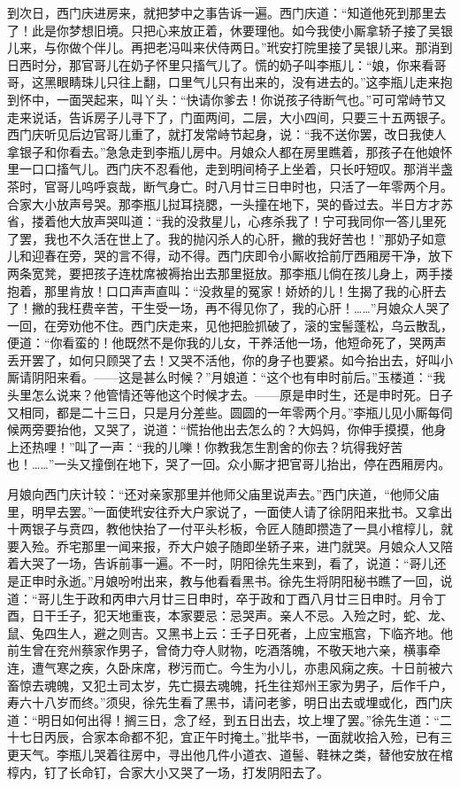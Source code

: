 到次日，西门庆进房来，就把梦中之事告诉一遍。西门庆道：“知道他死到那里去了！此是你梦想旧境。只把心来放正着，休要理他。如今我使小厮拿轿子接了吴银儿来，与你做个伴儿。再把老冯叫来伏侍两日。”玳安打院里接了吴银儿来。那消到日西时分，那官哥儿在奶子怀里只搐气儿了。慌的奶子叫李瓶儿：“娘，你来看哥哥，这黑眼睛珠儿只往上翻，口里气儿只有出来的，没有进去的。”这李瓶儿走来抱到怀中，一面哭起来，叫丫头：“快请你爹去！你说孩子待断气也。”可可常峙节又走来说话，告诉房子儿寻下了，门面两间，二层，大小四间，只要三十五两银子。西门庆听见后边官哥儿重了，就打发常峙节起身，说：“我不送你罢，改日我使人拿银子和你看去。”急急走到李瓶儿房中。月娘众人都在房里瞧着，那孩子在他娘怀里一口口搐气儿。西门庆不忍看他，走到明间椅子上坐着，只长吁短叹。那消半盏茶时，官哥儿呜呼哀哉，断气身亡。时八月廿三日申时也，只活了一年零两个月。合家大小放声号哭。那李瓶儿挝耳挠腮，一头撞在地下，哭的昏过去。半日方才苏省，搂着他大放声哭叫道：“我的没救星儿，心疼杀我了！宁可我同你一答儿里死了罢，我也不久活在世上了。我的抛闪杀人的心肝，撇的我好苦也！”那奶子如意儿和迎春在旁，哭的言不得，动不得。西门庆即令小厮收拾前厅西厢房干净，放下两条宽凳，要把孩子连枕席被褥抬出去那里挺放。那李瓶儿倘在孩儿身上，两手搂抱着，那里肯放！口口声声直叫：“没救星的冤家！娇娇的儿！生揭了我的心肝去了！撇的我枉费辛苦，干生受一场，再不得见你了，我的心肝！……”月娘众人哭了一回，在旁劝他不住。西门庆走来，见他把脸抓破了，滚的宝髻蓬松，乌云散乱，便道：“你看蛮的！他既然不是你我的儿女，干养活他一场，他短命死了，哭两声丢开罢了，如何只顾哭了去！又哭不活他，你的身子也要紧。如今抬出去，好叫小厮请阴阳来看。——这是甚么时候？”月娘道：“这个也有申时前后。”玉楼道：“我头里怎么说来？他管情还等他这个时候才去。——原是申时生，还是申时死。日子又相同，都是二十三日，只是月分差些。圆圆的一年零两个月。”李瓶儿见小厮每伺候两旁要抬他，又哭了，说道：“慌抬他出去怎么的？大妈妈，你伸手摸摸，他身上还热哩！”叫了一声：“我的儿嚛！你教我怎生割舍的你去？坑得我好苦也！……”一头又撞倒在地下，哭了一回。众小厮才把官哥儿抬出，停在西厢房内。

月娘向西门庆计较：“还对亲家那里并他师父庙里说声去。”西门庆道，“他师父庙里，明早去罢。”一面使玳安往乔大户家说了，一面使人请了徐阴阳来批书。又拿出十两银子与贲四，教他快抬了一付平头杉板，令匠人随即攒造了一具小棺椁儿，就要入殓。乔宅那里一闻来报，乔大户娘子随即坐轿子来，进门就哭。月娘众人又陪着大哭了一场，告诉前事一遍。不一时，阴阳徐先生来到，看了，说道：“哥儿还是正申时永逝。”月娘吩咐出来，教与他看看黑书。徐先生将阴阳秘书瞧了一回，说道：“哥儿生于政和丙申六月廿三日申时，卒于政和丁酉八月廿三日申时。月令丁酉，日干壬子，犯天地重丧，本家要忌：忌哭声。亲人不忌。入殓之时，蛇、龙、鼠、兔四生人，避之则吉。又黑书上云：壬子日死者，上应宝瓶宫，下临齐地。他前生曾在兖州蔡家作男子，曾倚力夺人财物，吃酒落魄，不敬天地六亲，横事牵连，遭气寒之疾，久卧床席，秽污而亡。今生为小儿，亦患风痫之疾。十日前被六畜惊去魂魄，又犯土司太岁，先亡摄去魂魄，托生往郑州王家为男子，后作千户，寿六十八岁而终。”须臾，徐先生看了黑书，请问老爹，明日出去或埋或化，西门庆道：“明日如何出得！搁三日，念了经，到五日出去，坟上埋了罢。”徐先生道：“二十七日丙辰，合家本命都不犯，宜正午时掩土。”批毕书，一面就收拾入殓，已有三更天气。李瓶儿哭着往房中，寻出他几件小道衣、道髻、鞋袜之类，替他安放在棺椁内，钉了长命钉，合家大小又哭了一场，打发阴阳去了。

